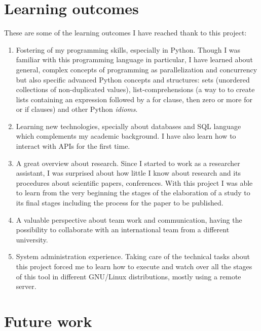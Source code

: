 \documentclass[a4paper, 12pt]{book}
\begin{document}
\section{Learning outcomes}
\label{sec:learning-outcomes}
These are some of the learning outcomes I have reached thank to this project:
\begin{enumerate}
  \item Fostering of my programming skills, especially in Python. Though I was familiar with
  this programming language in particular, I have learned about general, complex concepts of programming
  as parallelization and concurrency but also specific advanced Python concepts and structures:
  sets (unordered collections of non-duplicated values), list-comprehensions
  (a way to to create lists containing an expression followed by a for clause, then
  zero or more for or if clauses) and other Python \textit{idioms}.
  \item Learning new technologies, specially about databases and SQL language which
  complements my academic background. I have also learn how to interact with APIs for the first time.
  \item A great overview about research. Since I started to work as a researcher assistant,
  I was surprised about how little I know about research and its procedures about scientific papers,
  conferences. With this project I was able to learn from the very beginning the stages of the elaboration
  of a study to its final stages including the process for the paper to be published.
  \item A valuable perspective about team work and communication, having the possibility
  to collaborate with an international team from a different university.
  \item System administration experience. Taking care of the technical tasks about this project forced me
  to learn how to execute and watch over all the stages of this tool in different GNU/Linux distributions,
  mostly using a remote server.
\end{enumerate}

\section{Future work}
\label{sec:future-work}
\end{document}
